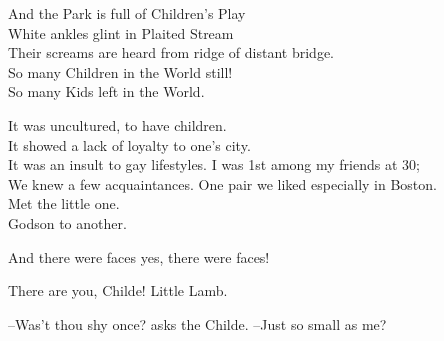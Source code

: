 \secdiv 

And the Park is full of Children's Play \\
White ankles glint in Plaited Stream \\
Their screams are heard from ridge of distant bridge. \\
So many Children in the World still! \\
So many Kids left in the World.

It was uncultured, to have children. \\
It showed a lack of loyalty to one's city. \\
It was an insult to gay lifestyles.
I was 1st among my friends at 30; \\
We knew a few acquaintances. One pair we liked especially in Boston. \\
Met the little one. \\
Godson to another.

And there were faces yes, there were faces!

There are you, Childe! Little Lamb. 

--Was't thou shy once? asks the Childe.
--Just so small as me?